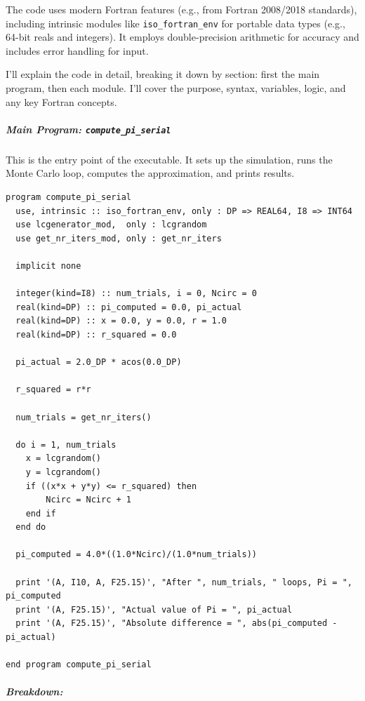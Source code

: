The code uses modern Fortran features (e.g., from Fortran 2008/2018 standards), including intrinsic modules like \texttt{iso\_fortran\_env} for portable data types (e.g., 64-bit reals and integers). It employs double-precision arithmetic for accuracy and includes error handling for input.

I'll explain the code in detail, breaking it down by section: first the main program, then each module. I'll cover the purpose, syntax, variables, logic, and any key Fortran concepts.

\subparagraph{Main Program: \texttt{compute\_pi\_serial}}

This is the entry point of the executable. It sets up the simulation, runs the Monte Carlo loop, computes the approximation, and prints results.

\begin{verbatim}
program compute_pi_serial
  use, intrinsic :: iso_fortran_env, only : DP => REAL64, I8 => INT64
  use lcgenerator_mod,  only : lcgrandom
  use get_nr_iters_mod, only : get_nr_iters
  
  implicit none

  integer(kind=I8) :: num_trials, i = 0, Ncirc = 0
  real(kind=DP) :: pi_computed = 0.0, pi_actual
  real(kind=DP) :: x = 0.0, y = 0.0, r = 1.0
  real(kind=DP) :: r_squared = 0.0

  pi_actual = 2.0_DP * acos(0.0_DP)
  
  r_squared = r*r

  num_trials = get_nr_iters()

  do i = 1, num_trials
    x = lcgrandom()
    y = lcgrandom()
    if ((x*x + y*y) <= r_squared) then
        Ncirc = Ncirc + 1
    end if
  end do

  pi_computed = 4.0*((1.0*Ncirc)/(1.0*num_trials))

  print '(A, I10, A, F25.15)', "After ", num_trials, " loops, Pi = ", pi_computed
  print '(A, F25.15)', "Actual value of Pi = ", pi_actual
  print '(A, F25.15)', "Absolute difference = ", abs(pi_computed - pi_actual)

end program compute_pi_serial
\end{verbatim}

\subparagraph{Breakdown:}

